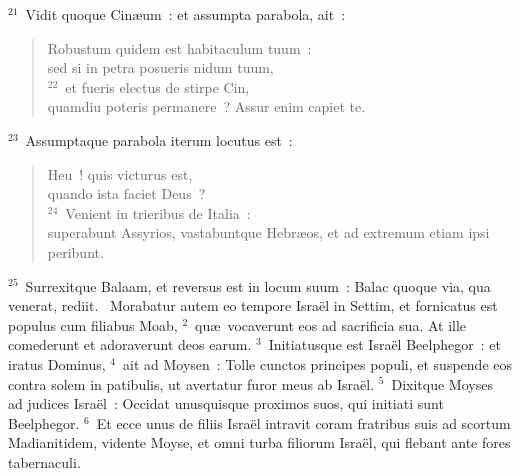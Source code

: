 ${}^{21}$~Vidit quoque Cin\ae um~: et assumpta parabola, ait~: \begin{flushleft}\begin{verse}Robustum quidem est habitaculum tuum~:\\ sed si in petra posueris nidum tuum,\\
${}^{22}$~et fueris electus de stirpe Cin,\\ quamdiu poteris permanere~? Assur enim capiet te.\end{verse}\end{flushleft}


${}^{23}$~Assumptaque parabola iterum locutus est~: \begin{flushleft}\begin{verse}Heu~! quis victurus est,\\ quando ista faciet Deus~?\\
${}^{24}$~Venient in trieribus de Italia~:\\ superabunt Assyrios, vastabuntque Hebr\ae os, et ad extremum etiam ipsi peribunt.\end{verse}\end{flushleft}


${}^{25}$~Surrexitque Balaam, et reversus est in locum suum~: Balac quoque via, qua venerat, rediit.
~Morabatur autem eo tempore Isra\"el in Settim, et fornicatus est populus cum filiabus Moab,
${}^{2}$~qu\ae\ vocaverunt eos ad sacrificia sua. At ille comederunt et adoraverunt deos earum.
${}^{3}$~Initiatusque est Isra\"el Beelphegor~: et iratus Dominus,
${}^{4}$~ait ad Moysen~: Tolle cunctos principes populi, et suspende eos contra solem in patibulis, ut avertatur furor meus ab Isra\"el.
${}^{5}$~Dixitque Moyses ad judices Isra\"el~: Occidat unusquisque proximos suos, qui initiati sunt Beelphegor.
${}^{6}$~Et ecce unus de filiis Isra\"el intravit coram fratribus suis ad scortum Madianitidem, vidente Moyse, et omni turba filiorum Isra\"el, qui flebant ante fores tabernaculi.


